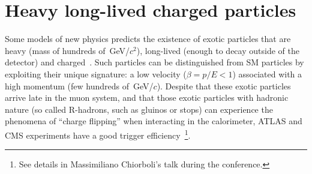 \documentclass{cimento}
\begin{document}
\section{Heavy long-lived charged particles} \label{HSCP}
Some models of new physics predicts the existence 
of exotic particles that are heavy (mass of hundreds of~GeV/$c^2$), 
long-lived (enough to decay outside of the detector) and charged~\cite{Fairbairn:2006gg}. 
Such particles can be distinguished from SM particles
by exploiting their unique signature: a low velocity ($\beta=p/E<1$) 
associated with a high momentum (few hundreds of~GeV/$c$).
Despite that these exotic particles arrive late in the muon system, and 
that those exotic particles with hadronic nature (so called R-hadrons, such as gluinos or stops) 
can experience the phenomena of ``charge flipping'' when interacting 
in the calorimeter, ATLAS and CMS experiments have a good trigger 
efficiency~\footnote{See details in Massimiliano Chiorboli's talk during the conference.}.
\end{document}
